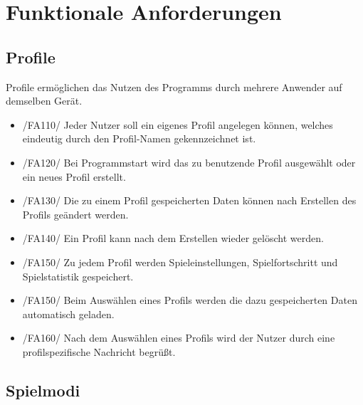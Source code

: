 \section{Funktionale Anforderungen}

\subsection{Profile}

Profile ermöglichen das Nutzen des Programms durch mehrere Anwender auf demselben Gerät.

\begin{itemize}
\item /FA110/ Jeder Nutzer soll ein eigenes Profil angelegen können, welches eindeutig durch den Profil-Namen gekennzeichnet ist. 
\item /FA120/ Bei Programmstart wird das zu benutzende Profil ausgewählt oder ein neues Profil erstellt.
\item /FA130/ Die zu einem Profil gespeicherten Daten können nach Erstellen des Profils geändert werden.
\item /FA140/ Ein Profil kann nach dem Erstellen wieder gelöscht werden.
\item /FA150/ Zu jedem Profil werden Spieleinstellungen, Spielfortschritt und Spielstatistik gespeichert.
\item /FA150/ Beim Auswählen eines Profils werden die dazu gespeicherten Daten automatisch geladen.
\item /FA160/ Nach dem Auswählen eines Profils wird der Nutzer durch eine profilspezifische Nachricht begrüßt.
\end{itemize}

\subsection{Spielmodi}

